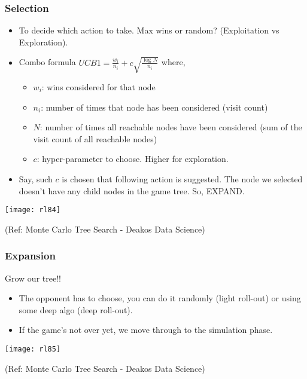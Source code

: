 \begin{frame}[fragile]\frametitle{Selection}

\begin{itemize}
\item To decide which action to take. Max wins or random? (Exploitation vs Exploration). 
\item Combo formula $UCB1 = \frac{w_i}{n_i} + c \sqrt{\frac{\log N}{n_i}}$ where,
	\begin{itemize}
	\item $w_i$: wins considered for that node
	\item $n_i$: number of times that node has been considered (visit count)
	\item $N$: number of times all reachable nodes have been considered (sum of the visit count of all reachable nodes)
	\item $c$: hyper-parameter to choose. Higher for exploration.
	\end{itemize}
\item Say, such $c$ is chosen that following action is suggested. The node we selected doesn't have any child nodes in the game tree. So, EXPAND.
\end{itemize}

\begin{center}
\texttt{[image: rl84]}
\end{center}


{\tiny (Ref: Monte Carlo Tree Search - Deakos Data Science)}

\end{frame}

\begin{frame}[fragile]\frametitle{Expansion}
Grow our tree!!

\begin{itemize}
\item The opponent has to choose, you can do it randomly (light roll-out) or using some deep algo (deep roll-out).
\item If the game's not over yet, we move through to the simulation phase. 
\end{itemize}

\begin{center}
\texttt{[image: rl85]}
\end{center}


{\tiny (Ref: Monte Carlo Tree Search - Deakos Data Science)}

\end{frame}

